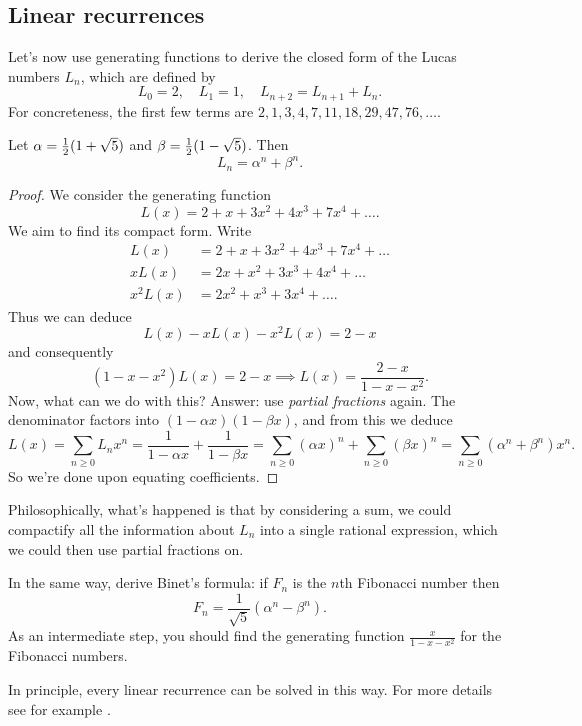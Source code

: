\documentclass[11pt]{scrartcl}
\begin{document}
\subsection{Linear recurrences}
Let's now use generating functions to derive the closed form of
the Lucas numbers $L_n$, which are defined by
\[ L_0 = 2, \quad L_1 = 1, \quad L_{n+2} = L_{n+1} + L_n.\]
For concreteness, the first few terms are
$2, 1, 3, 4, 7, 11, 18, 29, 47, 76, \dots$.
\begin{theorem}
  Let $\alpha = \frac{1}{2}(1+\sqrt5)$ and $\beta=\frac{1}{2}(1-\sqrt5)$.
  Then
  \[ L_n = \alpha^n + \beta^n. \]
\end{theorem}
\begin{proof}
  We consider the generating function
  \[ L(x) = 2 + x + 3x^2 + 4x^3 + 7x^4 + \dots. \]
  We aim to find its compact form.
  Write
  \begin{align*}
    L(x) &= 2 + x + 3x^2 + 4x^3 + 7x^4 + \dots \\
    xL(x) &= 2x + x^2 + 3x^3 + 4x^4 + \dots \\
    x^2L(x) &= 2x^2 + x^3 + 3x^4 + \dots.
  \end{align*}
  Thus we can deduce
  \[ L(x) - xL(x) - x^2L(x) = 2-x \]
  and consequently
  \[ (1-x-x^2)L(x) = 2-x
    \implies L(x) = \frac{2-x}{1-x-x^2}. \]
  Now, what can we do with this?
  Answer: use \emph{partial fractions} again.
  The denominator factors into $(1-\alpha x)(1-\beta x)$,
  and from this we deduce
  \[
    L(x) = \sum_{n \ge 0} L_n x^n
    = \frac{1}{1-\alpha x} + \frac{1}{1 - \beta x}
    = \sum_{n \ge 0} (\alpha x)^n + \sum_{n \ge 0} (\beta x)^n
    = \sum_{n \ge 0} \left( \alpha^n + \beta^n \right)x^n.
  \]
  So we're done upon equating coefficients.
\end{proof}
Philosophically, what's happened is that by considering a sum,
we could compactify all the information about $L_n$ into a single
rational expression, which we could then use partial fractions on.

\begin{exercise}
  In the same way, derive Binet's formula:
  if $F_n$ is the $n$th Fibonacci number then
  \[ F_n = \frac{1}{\sqrt5}(\alpha^n-\beta^n). \]
  As an intermediate step,
  you should find the generating function $\frac{x}{1-x-x^2}$
  for the Fibonacci numbers.
\end{exercise}

In principle, every linear recurrence can be solved in this way.
For more details see for example \cite{ref:linear}.
\end{document}
